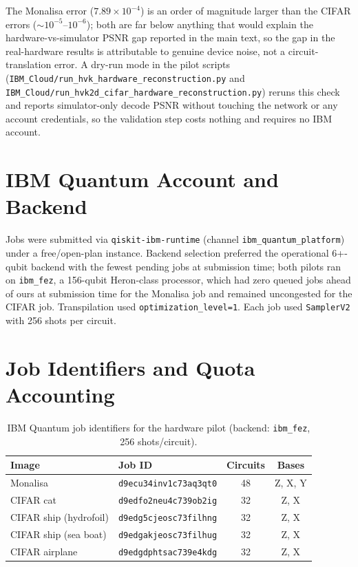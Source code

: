 \documentclass[11pt]{article}
\begin{document}
The Monalisa error ($7.89\times10^{-4}$) is an order of magnitude larger than the CIFAR errors ($\sim\!10^{-5}$--$10^{-6}$); both are far below anything that would explain the hardware-vs-simulator PSNR gap reported in the main text, so the gap in the real-hardware results is attributable to genuine device noise, not a circuit-translation error. A dry-run mode in the pilot scripts (\texttt{IBM\_Cloud/run\_hvk\_hardware\_reconstruction.py} and \texttt{IBM\_Cloud/run\_hvk2d\_cifar\_hardware\_reconstruction.py}) reruns this check and reports simulator-only decode PSNR without touching the network or any account credentials, so the validation step costs nothing and requires no IBM account.

\section{IBM Quantum Account and Backend}
Jobs were submitted via \texttt{qiskit-ibm-runtime} (channel \texttt{ibm\_quantum\_platform}) under a free/open-plan instance. Backend selection preferred the operational 6+-qubit backend with the fewest pending jobs at submission time; both pilots ran on \texttt{ibm\_fez}, a 156-qubit Heron-class processor, which had zero queued jobs ahead of ours at submission time for the Monalisa job and remained uncongested for the CIFAR job. Transpilation used \texttt{optimization\_level=1}. Each job used \texttt{SamplerV2} with 256 shots per circuit.

\section{Job Identifiers and Quota Accounting}
\begin{table}[H]
\centering
\caption{IBM Quantum job identifiers for the hardware pilot (backend: \texttt{ibm\_fez}, 256 shots/circuit).}
\begin{tabular}{llcc}
\toprule
Image & Job ID & Circuits & Bases \\
\midrule
Monalisa & \texttt{d9ecu34inv1c73aq3qt0} & 48 & Z, X, Y \\
CIFAR cat & \texttt{d9edfo2neu4c739ob2ig} & 32 & Z, X \\
CIFAR ship (hydrofoil) & \texttt{d9edg5cjeosc73filhng} & 32 & Z, X \\
CIFAR ship (sea boat) & \texttt{d9edgakjeosc73filhug} & 32 & Z, X \\
CIFAR airplane & \texttt{d9edgdphtsac739e4kdg} & 32 & Z, X \\
\bottomrule
\end{tabular}
\end{table}
\end{document}
